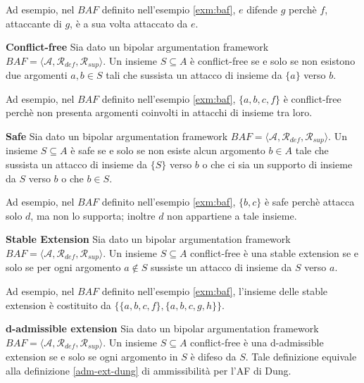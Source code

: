 Ad esempio, nel $BAF$ definito nell'esempio \ref{exm:baf}, $e$ difende $g$ perchè $f$, attaccante di $g$, è a sua volta attaccato da $e$.


\bigskip
\begin{defn} \textbf{Conflict-free} 
Sia dato un bipolar argumentation framework $BAF = ⟨\mathcal{A}, \mathcal{R}_{def}, \mathcal{R}_{sup}⟩$. Un insieme $S \subseteq A$ è conflict-free se e solo se non esistono due argomenti $a, b \in S$ tali che sussista un attacco di insieme da $\{a\}$ verso $b$.
\end{defn}

Ad esempio, nel $BAF$ definito nell'esempio \ref{exm:baf}, $\{a, b, c, f\}$ è conflict-free perchè non presenta argomenti coinvolti in attacchi di insieme tra loro.


\bigskip
\begin{defn} \textbf{Safe} 
Sia dato un bipolar argumentation framework $BAF = ⟨\mathcal{A}, \mathcal{R}_{def}, \mathcal{R}_{sup}⟩$. Un insieme $S \subseteq A$ è safe se e solo se non esiste alcun argomento $b \in A$ tale che sussista un attacco di insieme da $\{S\}$ verso $b$ o che ci sia un supporto di insieme da $S$ verso $b$ o che $b \in S$. 
\end{defn}

Ad esempio, nel $BAF$ definito nell'esempio \ref{exm:baf}, $\{b, c\}$ è safe perchè attacca solo $d$, ma non lo supporta; inoltre $d$ non appartiene a tale insieme.


\bigskip
\begin{defn} \textbf{Stable Extension} 
Sia dato un bipolar argumentation framework $BAF = ⟨\mathcal{A}, \mathcal{R}_{def}, \mathcal{R}_{sup}⟩$. Un insieme $S \subseteq A$ conflict-free è una stable extension se e solo se per ogni argomento $a \notin S$ sussiste un attacco di insieme da $S$ verso $a$.
\end{defn}

Ad esempio, nel $BAF$ definito nell'esempio \ref{exm:baf}, l'insieme delle stable extension è costituito da $\{\{a, b, c, f\}, \{a, b, c, g, h\}\}$.


\bigskip
\begin{defn} \textbf{d-admissible extension} 
Sia dato un bipolar argumentation framework $BAF = ⟨\mathcal{A}, \mathcal{R}_{def}, \mathcal{R}_{sup}⟩$. Un insieme $S \subseteq A$ conflict-free è una d-admissible extension se e solo se ogni argomento in $S$ è difeso da $S$. Tale definizione equivale alla definizione \ref{adm-ext-dung} di ammissibilità per l'AF di Dung.
\end{defn}

